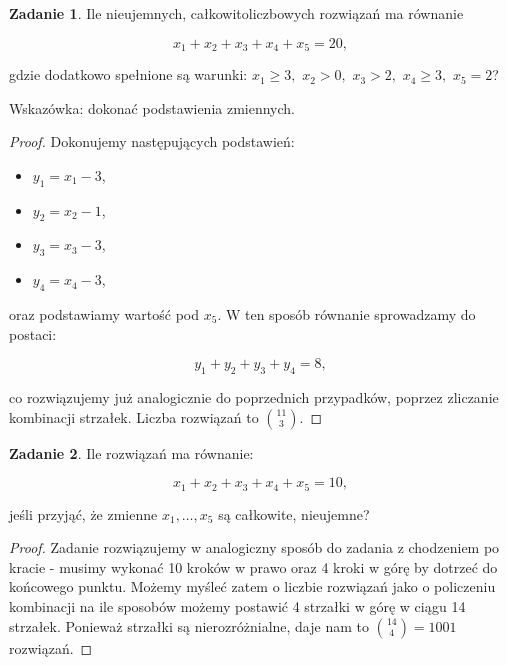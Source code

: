 \documentclass[11pt]{article}
\theoremstyle{definition}
\newtheorem{zadanie}{Zadanie}
\numberwithin{zadanie}{subsection}
\begin{document}
\begin{zadanie}
    Ile nieujemnych, całkowitoliczbowych rozwiązań ma równanie

    $$x_1 + x_2 + x_3 + x_4 + x_5 = 20,$$

    gdzie dodatkowo spełnione są warunki: $x_1 \geq 3,$ $x_2 > 0,$ $x_3 > 2,$ $x_4 \geq 3,$ $x_5 = 2$?

    Wskazówka: dokonać podstawienia zmiennych.
\end{zadanie}
\begin{proof}
    Dokonujemy następujących podstawień:
    \begin{itemize}
        \item $y_1 = x_1-3$,
        \item $y_2 = x_2-1$,
        \item $y_3 = x_3-3$,
        \item $y_4 = x_4-3$,
    \end{itemize}
    oraz podstawiamy wartość pod $x_5$. W ten sposób równanie sprowadzamy do postaci:

    $$y_1+y_2+y_3+y_4 = 8,$$

    co rozwiązujemy już analogicznie do poprzednich przypadków, poprzez zliczanie kombinacji strzałek. Liczba rozwiązań to $\binom{11}{3}$.

\end{proof}


\begin{zadanie}
    Ile rozwiązań ma równanie:

    $$x_1+x_2+x_3+x_4+x_5 = 10,$$

    jeśli przyjąć, że zmienne $x_1, \dots, x_5$ są całkowite, nieujemne?
\end{zadanie}
\begin{proof}
    Zadanie rozwiązujemy w analogiczny sposób do zadania z chodzeniem po kracie - musimy wykonać 10 kroków w prawo oraz 4 kroki w górę by dotrzeć do końcowego punktu. Możemy myśleć zatem o liczbie rozwiązań jako o policzeniu kombinacji na ile sposobów możemy postawić 4 strzałki w górę w ciągu 14 strzałek. Ponieważ strzałki są nierozróżnialne, daje nam to $\binom{14}{4} = 1001$ rozwiązań.
\end{proof}
\end{document}
